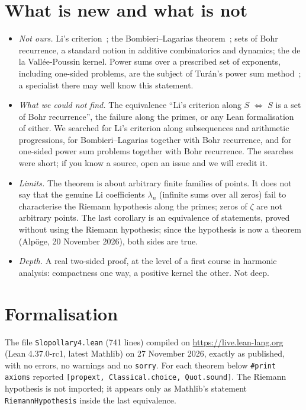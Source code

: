 \documentclass[11pt,a4paper]{article}
\theoremstyle{definition}\newtheorem*{definition}{Definition}
\theoremstyle{remark}\newtheorem*{remark}{Remark}
\begin{document}
\section{What is new and what is not}
\begin{itemize}[leftmargin=1.4em,itemsep=3pt]
\item \emph{Not ours.} Li's criterion~\cite{Li}; the Bombieri--Lagarias theorem~\cite{BL}; sets of
Bohr recurrence, a standard notion in additive combinatorics and dynamics; the
de la Vall\'ee-Poussin kernel. Power sums over a prescribed set of exponents, including one-sided
problems, are the subject of Tur\'an's power sum method~\cite{Turan}; a specialist there may well
know this statement.
\item \emph{What we could not find.} The equivalence ``Li's criterion along $S$ $\Leftrightarrow$
$S$ is a set of Bohr recurrence'', the failure along the primes, or any Lean formalisation of
either. We searched for Li's criterion along subsequences and arithmetic progressions, for
Bombieri--Lagarias together with Bohr recurrence, and for one-sided power sum problems together
with Bohr recurrence. The searches were short; if you know a source, open an issue and we will
credit it.
\item \emph{Limits.} The theorem is about arbitrary finite families of points. It does not say that
the genuine Li coefficients $\lambda_n$ (infinite sums over all zeros) fail to characterise the
Riemann hypothesis along the primes; zeros of $\zeta$ are not arbitrary points. The last corollary
is an equivalence of statements, proved without using the Riemann hypothesis; since the hypothesis
is now a theorem (Alp\"oge, 20 November 2026), both sides are true.
\item \emph{Depth.} A real two-sided proof, at the level of a first course in harmonic analysis:
compactness one way, a positive kernel the other. Not deep.
\end{itemize}

\section{Formalisation}
The file \texttt{Slopollary4.lean} (741 lines) compiled on \url{https://live.lean-lang.org}
(Lean 4.37.0-rc1, latest Mathlib) on 27 November 2026, exactly as published, with no errors, no
warnings and no \texttt{sorry}. For each theorem below \texttt{\#print axioms} reported
\texttt{[propext, Classical.choice, Quot.sound]}. The Riemann hypothesis is not imported; it
appears only as Mathlib's statement \texttt{RiemannHypothesis} inside the last equivalence.
\end{document}
